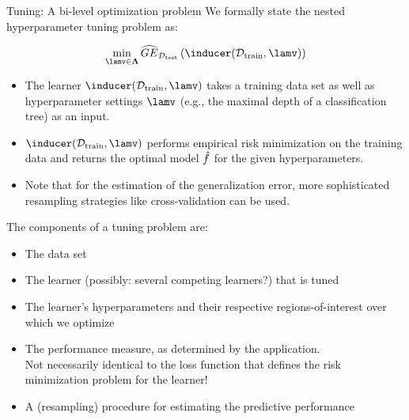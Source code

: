 \begin{vbframe}{Tuning: A bi-level optimization problem} 
We formally state the nested hyperparameter tuning problem as: 

$$
\min_{\lamv \in \bm{\Lambda}} \GEh{\Dtest}\left(\inducer(\Dtrain, \lamv)\right) 
$$

\begin{itemize}
\item The learner $\inducer(\Dtrain, \lamv)$ takes a training data set as well as hyperparameter settings $\lamv$ (e.g., the maximal depth of a classification tree) as an input. 
\item $\inducer(\Dtrain, \lamv)$ performs empirical risk minimization on the training data and returns the optimal model $\hat{f}$ for the given hyperparameters. 
\item Note that for the estimation of the generalization error, more sophisticated resampling strategies like cross-validation can be used.
\end{itemize}

\framebreak

The components of a tuning problem are: 

\begin{itemize}
\item The data set
\item The learner (possibly: several competing learners?) that is tuned %
\item The learner's hyperparameters and their respective regions-of-interest over which we optimize %
\item The performance measure, as determined by the application.\\ Not necessarily identical to the loss function that defines the risk minimization problem for the learner!\\ 
\item A (resampling) procedure for estimating the predictive performance
\end{itemize}



\end{vbframe}




